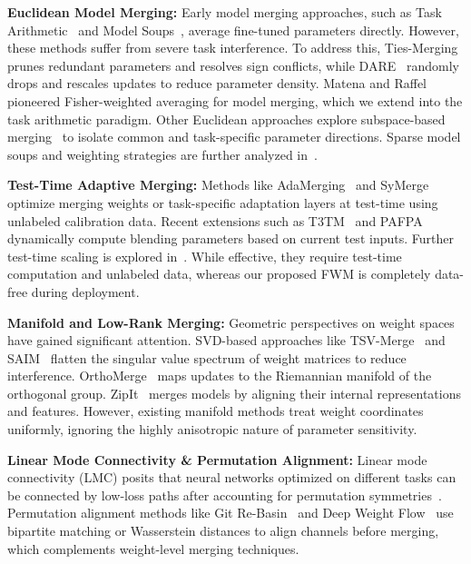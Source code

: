 \documentclass{article}
\theoremstyle{plain}
\theoremstyle{definition}
\theoremstyle{remark}
\begin{document}
\textbf{Euclidean Model Merging:} Early model merging approaches, such as Task Arithmetic~\cite{ilharco23} and Model Soups~\cite{wortsman22a, Wortsman2022ModelSA}, average fine-tuned parameters directly. However, these methods suffer from severe task interference. To address this, Ties-Merging~\cite{yadav24, Yadav2023TIESMergingRI, Yadav2024WhatMF, Yadav2025RobustFO} prunes redundant parameters and resolves sign conflicts, while DARE~\cite{yu24} randomly drops and rescales updates to reduce parameter density. Matena and Raffel~\cite{matena22, Matena2021MergingMW} pioneered Fisher-weighted averaging for model merging, which we extend into the task arithmetic paradigm. Other Euclidean approaches explore subspace-based merging~\cite{Marczak2025NoTL, Gargiulo2024TaskSV, Skorobogat2025SubspaceBoostedMM} to isolate common and task-specific parameter directions. Sparse model soups and weighting strategies are further analyzed in~\cite{Zimmer2023SparseMS, Tran2025LeveragingMS, Croce2023SeasoningMS}.

\textbf{Test-Time Adaptive Merging:} Methods like AdaMerging~\cite{yang24b} and SyMerge~\cite{jung25} optimize merging weights or task-specific adaptation layers at test-time using unlabeled calibration data. Recent extensions such as T3TM~\cite{Imam2025T3TM} and PAFPA~\cite{Chen2025PAFPA} dynamically compute blending parameters based on current test inputs. Further test-time scaling is explored in~\cite{Xie2026BDMergingBD, Huang2024FastAL}. While effective, they require test-time computation and unlabeled data, whereas our proposed FWM is completely data-free during deployment.

\textbf{Manifold and Low-Rank Merging:} Geometric perspectives on weight spaces have gained significant attention. SVD-based approaches like TSV-Merge~\cite{gargiulo25, Gargiulo2024TaskSV} and SAIM~\cite{saim26} flatten the singular value spectrum of weight matrices to reduce interference. OrthoMerge~\cite{yang26, Tang2025MergingMO} maps updates to the Riemannian manifold of the orthogonal group. ZipIt~\cite{Stoica2023ZipItMM, Wu2025UnlockingEL} merges models by aligning their internal representations and features. However, existing manifold methods treat weight coordinates uniformly, ignoring the highly anisotropic nature of parameter sensitivity.

\textbf{Linear Mode Connectivity \& Permutation Alignment:} Linear mode connectivity (LMC) posits that neural networks optimized on different tasks can be connected by low-loss paths after accounting for permutation symmetries~\cite{Entezari2021TheRO, Ainsworth2022GitRM, Ferbach2023ProvingLM, Yunis2022OnCA, Zhou2023GoingBL}. Permutation alignment methods like Git Re-Basin~\cite{Ainsworth2022GitRM} and Deep Weight Flow~\cite{Gupta2026DeepWeightFlowRF} use bipartite matching or Wasserstein distances to align channels before merging, which complements weight-level merging techniques.
\end{document}

